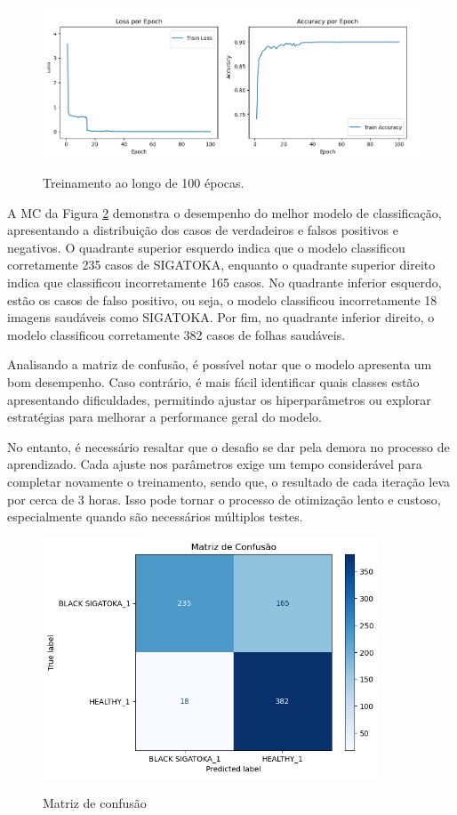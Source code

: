 \begin{figure}[!h]
	\centering
	\caption{Treinamento ao longo de 100 épocas.}
	\includegraphics[width=15cm]{figuras/100 epocas.png}\\
	\label{Fig:100epocas}
\end{figure}

 A \ac{MC} da Figura \ref{Fig:100Matriz} demonstra o desempenho do melhor modelo de classificação, apresentando a distribuição dos casos de verdadeiros e falsos positivos e negativos. O quadrante superior esquerdo indica que o modelo classificou corretamente 235 casos de SIGATOKA, enquanto o quadrante superior direito indica que classificou incorretamente 165 casos. No quadrante inferior esquerdo, estão os casos de falso positivo, ou seja, o modelo classificou incorretamente 18 imagens saudáveis como SIGATOKA. Por fim, no quadrante inferior direito, o modelo classificou corretamente 382 casos de folhas saudáveis.

Analisando a matriz de confusão, é possível notar que o modelo apresenta um bom desempenho. Caso contrário, é mais fácil identificar quais classes estão apresentando dificuldades, permitindo ajustar os hiperparâmetros ou explorar estratégias para melhorar a performance geral do modelo.

 
No entanto, é necessário resaltar que o desafio se dar pela demora no processo de aprendizado. Cada ajuste nos parâmetros exige um tempo considerável para completar novamente o treinamento, sendo que, o resultado de cada iteração leva por cerca de 3 horas. Isso pode tornar o processo de otimização lento e custoso, especialmente quando são necessários múltiplos testes.

\begin{figure}[!h]
	\centering
	\caption{Matriz de confusão}
	\includegraphics[width=10cm]{figuras/100 epocMatriz.png}\\
	\label{Fig:100Matriz}
\end{figure}


